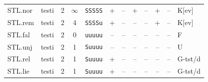 {\begin{longtable}{@{}llcccccccccl@{}}
STL.nor & testi & 2 & $\infty$ & \texttt{SSSSS} & \textsf{+} & \textsf{--} & \textsf{+} & \textsf{--} & \textsf{+} & -- & K[ev] \\
STL.rem & testi & 2 & 4 & \texttt{SSSSu} & \textsf{+} & \textsf{--} & \textsf{--} & \textsf{--} & \textsf{+} & -- & K[ev] \\
STL.fal & testi & 2 & 0 & \texttt{uuuuu} & \textsf{--} & \textsf{--} & \textsf{--} & \textsf{--} & \textsf{--} & -- & F \\
STL.unj & testi & 2 & 1 & \texttt{Suuuu} & \textsf{--} & \textsf{--} & \textsf{--} & \textsf{--} & \textsf{--} & -- & U \\
STL.rel & testi & 2 & 1 & \texttt{Suuuu} & \textsf{+} & \textsf{--} & \textsf{--} & \textsf{--} & \textsf{--} & -- & G-tst/d \\
STL.lie & testi & 2 & 1 & \texttt{Suuuu} & \textsf{+} & \textsf{--} & \textsf{--} & \textsf{--} & \textsf{--} & -- & G-tst/d \\
\end{longtable}}
